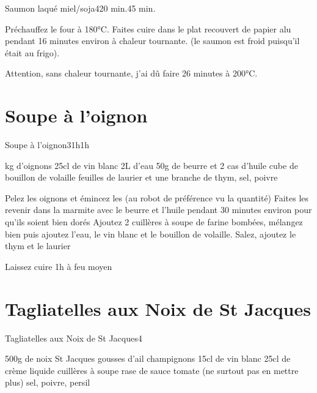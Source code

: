 {\begin{recette}{Saumon laqué miel/soja}{4}{20 min.}{45 min.}
\begin{cuisson}
Préchauffez le four à 180°C. Faites cuire dans le plat recouvert de papier alu pendant 16 minutes environ à chaleur tournante. (le saumon est froid puisqu'il était au frigo).
\begin{remarque}
Attention, sans chaleur tournante, j'ai dû faire 26 minutes à 200°C.
\end{remarque}

\end{cuisson}
\end{recette}

\section{Soupe à l'oignon}
\begin{recette}{Soupe à l'oignon}{3}{1h}{1h}
\begin{ingredients}
 kg d'oignons
\ingredient 25cl de vin blanc
\ingredient 2L d'eau
\ingredient 50g de beurre et 2 cas d'huile
 cube de bouillon de volaille
 feuilles de laurier et une branche de thym, sel, poivre
\end{ingredients}

\begin{preparation}
\etape Pelez les oignons et émincez les (au robot de préférence vu la quantité)
\etape Faites les revenir dans la marmite avec le beurre et l'huile pendant 30 minutes environ pour qu'ils soient bien dorés
\etape Ajoutez 2 cuillères à soupe de farine bombées, mélangez bien puis ajoutez l'eau, le vin blanc et le bouillon de volaille. Salez, ajoutez le thym et le laurier
\end{preparation}

\begin{cuisson}
Laissez cuire 1h à feu moyen
\end{cuisson}
\end{recette}

\section{Tagliatelles aux Noix de St Jacques}
\begin{recette}{Tagliatelles aux Noix de St Jacques}{4}{}{}
\begin{ingredients}
\ingredient 500g de noix St Jacques
 gousses d'ail
 champignons
\ingredient 15cl de vin blanc
\ingredient 25cl de crème liquide
 cuillères à soupe rase de sauce tomate (ne surtout pas en mettre plus)
\ingredient sel, poivre, persil
\end{ingredients}


\end{recette}}
